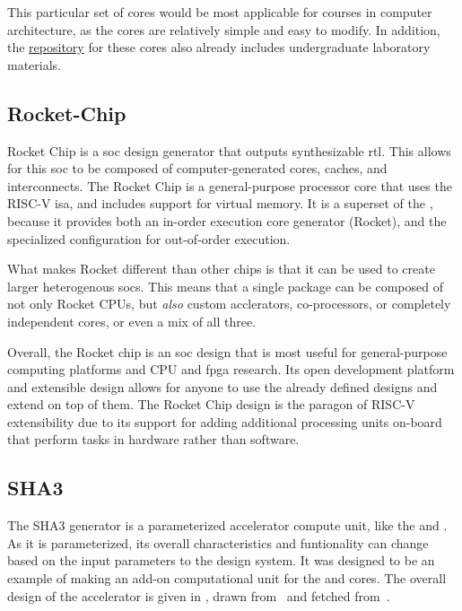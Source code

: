 This particular set of cores would be most applicable for courses in computer architecture, as the cores are relatively simple and easy to modify.
In addition, the \href{https://github.com/ucb-bar/riscv-sodor}{repository} for these cores also already includes undergraduate laboratory materials.

\subsection{Rocket-Chip}\label{sec:Rocket_Chip}
\nocite{rocketChipPaper}
\nocite{rocketChipGithub}
Rocket Chip is a \gls{soc} design generator that outputs synthesizable \gls{rtl}.
This allows for this \gls{soc} to be composed of computer-generated cores, caches, and interconnects.
The Rocket Chip is a general-purpose processor core that uses the RISC-V \gls{isa}, and includes support for virtual memory.
It is a superset of the , because it provides both an in-order execution core generator (Rocket), and the specialized  configuration for out-of-order execution.

What makes Rocket different than other chips is that it can be used to create larger heterogenous \glspl{soc}.
This means that a single package can be composed of not only Rocket CPUs, but \emph{also} custom acclerators, co-processors, or completely independent cores, or even a mix of all three.

Overall, the Rocket chip is an \gls{soc} design that is most useful for general-purpose computing platforms and CPU and \gls{fpga} research.
Its open development platform and extensible design allows for anyone to use the already defined designs and extend on top of them.
The Rocket Chip design is the paragon of RISC-V extensibility due to its support for adding additional processing units on-board that perform tasks in hardware rather than software.

\subsection{SHA3}\label{sec:SHA3_Accelerators_Generator}
\nocite{sha3Paper}
\nocite{sha3Github}
The SHA3 generator is a parameterized accelerator compute unit, like the  and .
As it is parameterized, its overall characteristics and funtionality can change based on the input parameters to the design system.
It was designed to be an example of making an add-on computational unit for the  and  cores.
The overall design of the accelerator is given in , drawn from~\cite{sha3Paper} and fetched from~\cite{sha3Github}.

